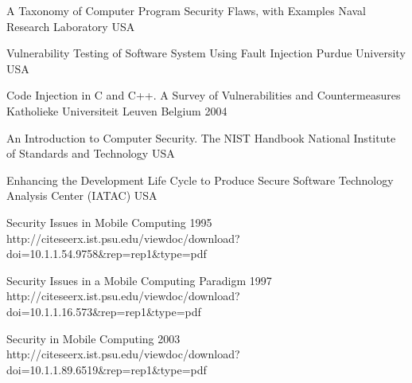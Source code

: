 \begin{thebibliography}{9}

		{
			\BibAnd
			\BibAnd
			\BibAnd
			}
		{A Taxonomy of Computer Program Security Flaws, with Examples}
		{Naval Research Laboratory}
		{USA}
		{}
		
		{
			\BibAnd
			}
		{Vulnerability Testing of Software System Using Fault Injection}
		{Purdue University}
		{USA}
		{}

		{
			\BibAnd
			\BibAnd
			}
		{Code Injection in {C} and {C++}. A Survey of Vulnerabilities and Countermeasures}
		{Katholieke Universiteit Leuven}
		{Belgium}
		{2004}
		
		{}
		{An Introduction to Computer Security. The {NIST} Handbook}
		{National Institute of Standards and Technology}
		{USA}
		{}
	
		{
			\BibAnd
			}
		{Enhancing the Development Life Cycle to Produce Secure Software}
		{Technology Analysis Center (IATAC)}
		{USA}
		{}



		{}
		{Security Issues in Mobile Computing}	
		{1995}	
		{http://citeseerx.ist.psu.edu/viewdoc/download?doi=10.1.1.54.9758\&rep=rep1\&type=pdf}
		
		{
			\BibAnd
			}
		{Security Issues in a Mobile Computing Paradigm}	
		{1997}	
		{http://citeseerx.ist.psu.edu/viewdoc/download?doi=10.1.1.16.573\&rep=rep1\&type=pdf}
	
		{
			\BibAnd
			\BibAnd
			\BibAnd
			}
		{Security in Mobile Computing}	
		{2003}	
		{http://citeseerx.ist.psu.edu/viewdoc/download?doi=10.1.1.89.6519\&rep=rep1\&type=pdf}


\end{thebibliography}
